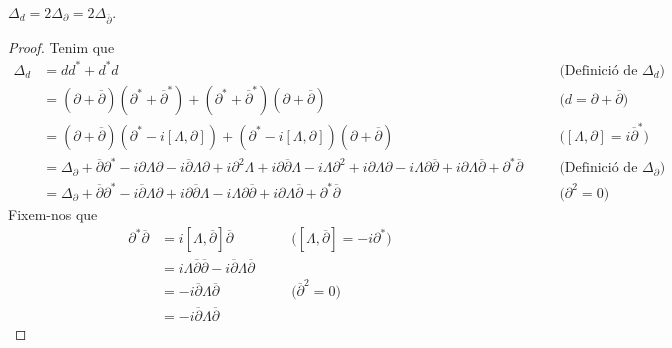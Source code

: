 \begin{proposicio}
    $\Delta_{d}=2\Delta_{\partial}=2\Delta_{\overline{\partial}}$.
    \begin{proof}
        Tenim que
        \begin{align*}
            \Delta_{d}
            &=dd^{*}+d^{*}d
            &\quad&\textrm{(Definició de $\Delta_{d}$)}\\
            &=(\partial+\overline{\partial})(\partial^{*}+\overline{\partial}^{*})+(\partial^{*}+\overline{\partial}^{*})(\partial+\overline{\partial})
            &\quad&\textrm{($d=\partial+\overline{\partial}$)}\\
            &=(\partial+\overline{\partial})(\partial^{*}-i[\Lambda,\partial])+(\partial^{*}-i[\Lambda,\partial])(\partial+\overline{\partial})
            &\quad&\textrm{($[\Lambda,\partial]=i\overline{\partial}^{*}$)}\\
            &=\Delta_{\partial}
            +\overline{\partial}\partial^{*}
            -i\partial\Lambda\partial
            -i\overline{\partial}\Lambda\partial
            +i\partial^{2}\Lambda
            +i\partial\overline{\partial}\Lambda
            -i\Lambda\partial^{2}
            +i\partial\Lambda\partial
            -i\Lambda\partial\overline{\partial}
            +i\partial\Lambda\overline{\partial}
            +\partial^{*}\overline{\partial}
            &\quad&\textrm{(Definició de $\Delta_{\partial}$)}\\
            &=\Delta_{\partial}
            +\overline{\partial}\partial^{*}
            -i\overline{\partial}\Lambda\partial
            +i\partial\overline{\partial}\Lambda
            -i\Lambda\partial\overline{\partial}
            +i\partial\Lambda\overline{\partial}
            +\partial^{*}\overline{\partial}
            &\quad&\textrm{($\partial^{2}=0$)}
        \end{align*}
        Fixem-nos que
        \begin{align*}
            \partial^{*}\overline{\partial}
            &=i[\Lambda,\overline{\partial}]\overline{\partial}
            &\quad&\textrm{($[\Lambda,\overline{\partial}]=-i\partial^{*}$)}\\
            &=i\Lambda\overline{\partial}\overline{\partial}
            -i\overline{\partial}\Lambda\overline{\partial}\\
            &=-i\overline{\partial}\Lambda\overline{\partial}
            &\quad&\textrm{($\overline{\partial}^{2}=0$)}\\
            &=-i\overline{\partial}\Lambda\overline{\partial}

\end{align*}
\end{proof}
\end{proposicio}

